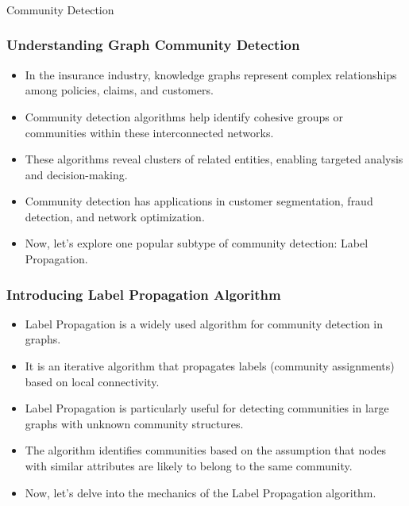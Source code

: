 \begin{frame}[fragile]\frametitle{}
\begin{center}
{\Large Community Detection}
\end{center}
\end{frame}

\begin{frame}[fragile]\frametitle{Understanding Graph Community Detection}
\begin{itemize}
\item In the insurance industry, knowledge graphs represent complex relationships among policies, claims, and customers.
\item Community detection algorithms help identify cohesive groups or communities within these interconnected networks.
\item These algorithms reveal clusters of related entities, enabling targeted analysis and decision-making.
\item Community detection has applications in customer segmentation, fraud detection, and network optimization.
\item Now, let's explore one popular subtype of community detection: Label Propagation.
\end{itemize}
\end{frame}

\begin{frame}[fragile]\frametitle{Introducing Label Propagation Algorithm}
\begin{itemize}
\item Label Propagation is a widely used algorithm for community detection in graphs.
\item It is an iterative algorithm that propagates labels (community assignments) based on local connectivity.
\item Label Propagation is particularly useful for detecting communities in large graphs with unknown community structures.
\item The algorithm identifies communities based on the assumption that nodes with similar attributes are likely to belong to the same community.
\item Now, let's delve into the mechanics of the Label Propagation algorithm.
\end{itemize}
\end{frame}

